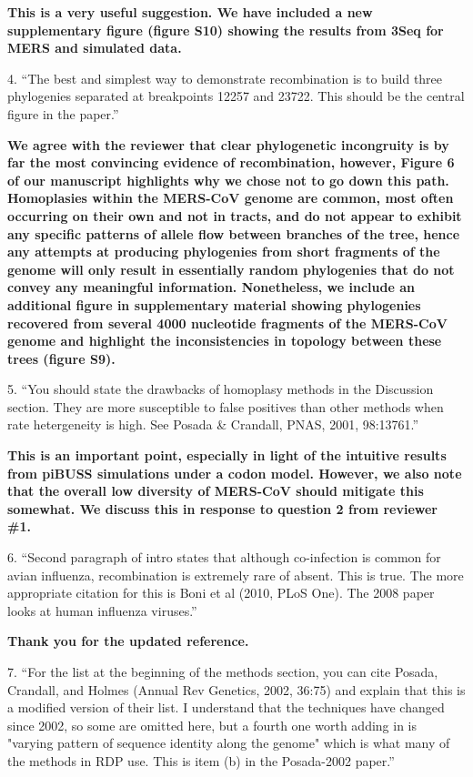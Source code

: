 \documentclass[11pt,oneside,letterpaper]{article}
\begin{document}
\textbf{This is a very useful suggestion. We have included a new supplementary figure (figure S10) showing the results from 3Seq for MERS and simulated data.}

4. ``The best and simplest way to demonstrate recombination is to build three phylogenies separated at breakpoints 12257 and 23722.  
This should be the central figure in the paper.''

\textbf{We agree with the reviewer that clear phylogenetic incongruity is by far the most convincing evidence of recombination, however, Figure 6 of our manuscript highlights why we chose not to go down this path. 
Homoplasies within the MERS-CoV genome are common, most often occurring on their own and not in tracts, and do not appear to exhibit any specific patterns of allele flow between branches of the tree, hence any attempts at producing phylogenies from short fragments of the genome will only result in essentially random phylogenies that do not convey any meaningful information.
Nonetheless, we include an additional figure in supplementary material showing phylogenies recovered from several 4000 nucleotide fragments of the MERS-CoV genome and highlight the inconsistencies in topology between these trees (figure S9).}

5. ``You should state the drawbacks of homoplasy methods in the Discussion section.  
They are more susceptible to false positives than other methods when rate hetergeneity is high.
See Posada \& Crandall, PNAS, 2001, 98:13761.''

\textbf{This is an important point, especially in light of the intuitive results from piBUSS simulations under a codon model. 
However, we also note that the overall low diversity of MERS-CoV should mitigate this somewhat. 
We discuss this in response to question 2 from reviewer \#1.}

6. ``Second paragraph of intro states that although co-infection is common for avian influenza, recombination is extremely rare of absent.  
This is true.  
The more appropriate citation for this is Boni et al (2010, PLoS One).  
The 2008 paper looks at human influenza viruses.''

\textbf{Thank you for the updated reference.}

7. ``For the list at the beginning of the methods section, you can cite Posada, Crandall, and Holmes (Annual Rev Genetics, 2002, 36:75) and explain that this is a modified version of their list.  
I understand that the techniques have changed since 2002, so some are omitted here, but a fourth one worth adding in is "varying pattern of sequence identity along the genome" which is what many of the methods in RDP use.  
This is item (b) in the Posada-2002 paper.''
\end{document}
